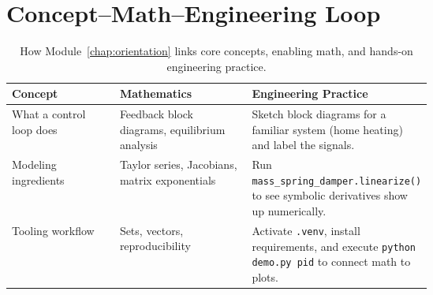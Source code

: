 \section{Concept--Math--Engineering Loop}
\begin{table}[h]
    \centering
    \small
    \renewcommand{\arraystretch}{1.2}
    \begin{tabularx}{\linewidth}{|>{\raggedright\arraybackslash}p{0.28\linewidth}|>{\raggedright\arraybackslash}p{0.34\linewidth}|>{\raggedright\arraybackslash}X|}
        \hline
        \textbf{Concept} & \textbf{Mathematics} & \textbf{Engineering Practice} \\
        \hline
        What a control loop does & Feedback block diagrams, equilibrium analysis & Sketch block diagrams for a familiar system (home heating) and label the signals. \\
        \hline
        Modeling ingredients & Taylor series, Jacobians, matrix exponentials & Run \texttt{mass\_spring\_damper.linearize()} to see symbolic derivatives show up numerically. \\
        \hline
        Tooling workflow & Sets, vectors, reproducibility & Activate \texttt{.venv}, install requirements, and execute \texttt{python demo.py pid} to connect math to plots. \\
        \hline
    \end{tabularx}
    \caption{How Module~\ref{chap:orientation} links core concepts, enabling math, and hands-on engineering practice.}
\end{table}

